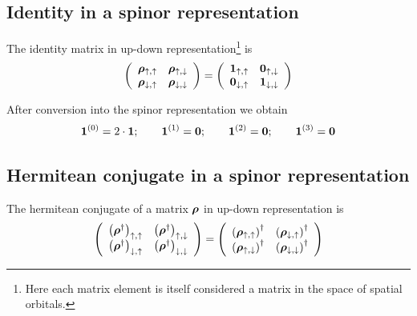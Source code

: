\documentclass[11pt,a4paper]{report}
\begin{document}
\subsection{Identity in a spinor representation}
The identity matrix in up-down representation\footnote{Here each
  matrix element is itself considered a matrix in the space of spatial
  orbitals.} is
\begin{eqnarray}
\left(\begin{array}{cc}
\bm{\rho}_{\uparrow,\uparrow}&\bm{\rho}_{\uparrow,\downarrow}\\
\bm{\rho}_{\downarrow,\uparrow}&\bm{\rho}_{\downarrow,\downarrow}\\
\end{array}\right)
=
\left(\begin{array}{cc}
\bm{1}_{\uparrow,\uparrow}&\bm{0}_{\uparrow,\downarrow}\\
\bm{0}_{\downarrow,\uparrow}&\bm{1}_{\downarrow,\downarrow}\\
\end{array}\right)
\end{eqnarray}

After conversion into the spinor representation we obtain
\begin{eqnarray}
\bm{1}^{(0)}=2\cdot\bm{1};\qquad
\bm{1}^{(1)}=\bm{0};\qquad
\bm{1}^{(2)}=\bm{0};\qquad
\bm{1}^{(3)}=\bm{0}
\end{eqnarray}

\subsection{Hermitean conjugate  in a spinor representation}
The hermitean conjugate of a matrix $\bm{\rho}$ in up-down
representation is
\begin{eqnarray}
\left(\begin{array}{cc}
\left(\bm{\rho}^\dagger\right)_{\uparrow,\uparrow}
&\left(\bm{\rho}^\dagger\right)_{\uparrow,\downarrow}\\
\left(\bm{\rho}^\dagger\right)_{\downarrow,\uparrow}
&\left(\bm{\rho}^\dagger\right)_{\downarrow,\downarrow}\\
\end{array}\right)
=
\left(\begin{array}{cc}
 \left(\bm{\rho}_{\uparrow,\uparrow}    \right)^\dagger
&\left(\bm{\rho}_{\downarrow,\uparrow}  \right)^\dagger\\
 \left(\bm{\rho}_{\uparrow,\downarrow}  \right)^\dagger
&\left(\bm{\rho}_{\downarrow,\downarrow}\right)^\dagger\\
\end{array}\right)
\end{eqnarray}
\end{document}
